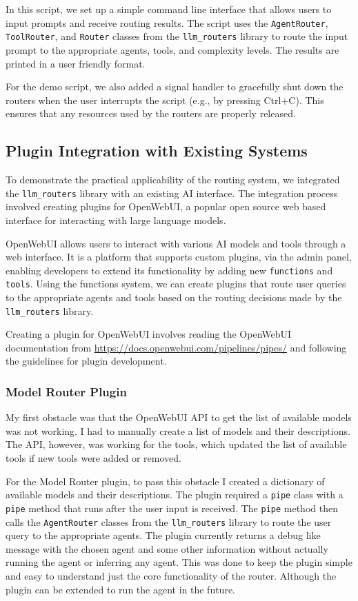 In this script, we set up a simple command line interface that allows users to input prompts and receive routing results. The script uses the \texttt{AgentRouter}, \texttt{ToolRouter}, and \texttt{Router} classes from the \texttt{llm\_routers} library to route the input prompt to the appropriate agents, tools, and complexity levels. The results are printed in a user friendly format.

For the demo script, we also added a signal handler to gracefully shut down the routers when the user interrupts the script (e.g., by pressing Ctrl+C). This ensures that any resources used by the routers are properly released.

\subsection{Plugin Integration with Existing Systems}

To demonstrate the practical applicability of the routing system, we integrated the \texttt{llm\_routers} library with an existing AI interface. The integration process involved creating plugins for OpenWebUI, a popular open source web based interface for interacting with large language models.

OpenWebUI allows users to interact with various AI models and tools through a web interface. It is a platform that supports custom plugins, via the admin panel, enabling developers to extend its functionality by adding new \texttt{functions} and \texttt{tools}. Using the functions system, we can create plugins that route user queries to the appropriate agents and tools based on the routing decisions made by the \texttt{llm\_routers} library.

Creating a plugin for OpenWebUI involves reading the OpenWebUI documentation from \url{https://docs.openwebui.com/pipelines/pipes/} and following the guidelines for plugin development.

\subsubsection{Model Router Plugin}

My first obstacle was that the OpenWebUI API to get the list of available models was not working. I had to manually create a list of models and their descriptions. The API, however, was working for the tools, which updated the list of available tools if new tools were added or removed.

For the Model Router plugin, to pass this obstacle I created a dictionary of available models and their descriptions. The plugin required a \texttt{pipe} class with a \texttt{pipe} method that runs after the user input is received. The \texttt{pipe} method then calls the \texttt{AgentRouter} classes from the \texttt{llm\_routers} library to route the user query to the appropriate agents. The plugin currently returns a debug like message with the chosen agent and some other information without actually running the agent or inferring any agent. This was done to keep the plugin simple and easy to understand just the core functionality of the router. Although the plugin can be extended to run the agent in the future.

